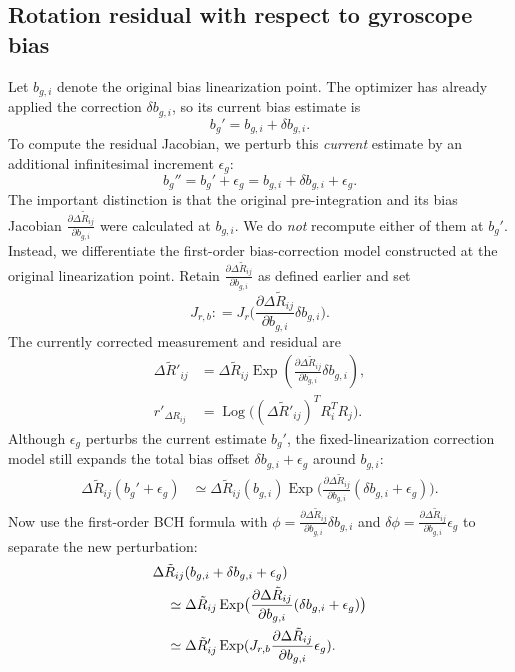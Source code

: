 \documentclass[11pt,a4paper]{article}
\newcommand{\Exp}{\operatorname{Exp}}
\newcommand{\Log}{\operatorname{Log}}
\newcommand{\defeq}{\mathrel{\mathop:}=}
\begin{document}
\subsection{Rotation residual with respect to gyroscope bias}
Let $b_{g,i}$ denote the original bias linearization point.
The optimizer has already applied the correction $\delta b_{g,i}$,
so its current bias estimate is
\begin{equation}
b_g'=b_{g,i}+\delta b_{g,i}.
\end{equation}
To compute the residual Jacobian, we perturb this \emph{current}
estimate by an additional infinitesimal increment $\epsilon_g$:
\begin{equation}
b_g''=b_g'+\epsilon_g
=b_{g,i}+\delta b_{g,i}+\epsilon_g.
\end{equation}
The important distinction is that the original pre-integration
and its bias Jacobian $\frac{\partial\Delta\tilde R_{ij}}{\partial b_{g,i}}$ were calculated at $b_{g,i}$.
We do \emph{not} recompute either of them at $b_g'$.
Instead, we differentiate the first-order bias-correction model
constructed at the original linearization point.
Retain $\frac{\partial\Delta\tilde R_{ij}}{\partial b_{g,i}}$ as defined earlier and set
\begin{equation}
J_{r,b}\defeq J_r\bigl(\frac{\partial\Delta\tilde R_{ij}}{\partial b_{g,i}}\delta b_{g,i}\bigr).
\end{equation}
The currently corrected measurement and residual are
\begin{align}
\Delta\tilde R'_{ij}&=\Delta\tilde R_{ij}
\Exp(\frac{\partial\Delta\tilde R_{ij}}{\partial b_{g,i}}\delta b_{g,i}),\\
r'_{\Delta R_{ij}}&=\Log\bigl((\Delta\tilde R'_{ij})^TR_i^TR_j\bigr).
\end{align}
Although $\epsilon_g$ perturbs the current estimate $b_g'$,
the fixed-linearization correction model still expands the total
bias offset $\delta b_{g,i}+\epsilon_g$ around $b_{g,i}$:
\begin{align}
\Delta\tilde R_{ij}(b_g' + \epsilon_g)
&\simeq\Delta\tilde R_{ij}(b_{g,i})
\Exp\bigl(\frac{\partial\Delta\tilde R_{ij}}{\partial b_{g,i}}(\delta b_{g,i}+\epsilon_g)\bigr).
\end{align}
Now use the first-order BCH formula with
$\phi=\frac{\partial\Delta\tilde R_{ij}}{\partial b_{g,i}}\delta b_{g,i}$ and
$\delta\phi=\frac{\partial\Delta\tilde R_{ij}}{\partial b_{g,i}}\epsilon_g$ to separate the new perturbation:
\begin{align}
&\Delta\tilde R_{ij}(b_{g,i}+\delta b_{g,i}+\epsilon_g)\notag\\
&\quad\simeq\Delta\tilde R_{ij}
\Exp\bigl(\frac{\partial\Delta\tilde R_{ij}}{\partial b_{g,i}}(\delta b_{g,i}+\epsilon_g)\bigr)\notag\\
&\quad\simeq\Delta\tilde R'_{ij}
\Exp(J_{r,b}\frac{\partial\Delta\tilde R_{ij}}{\partial b_{g,i}}\epsilon_g).
\end{align}
\end{document}
